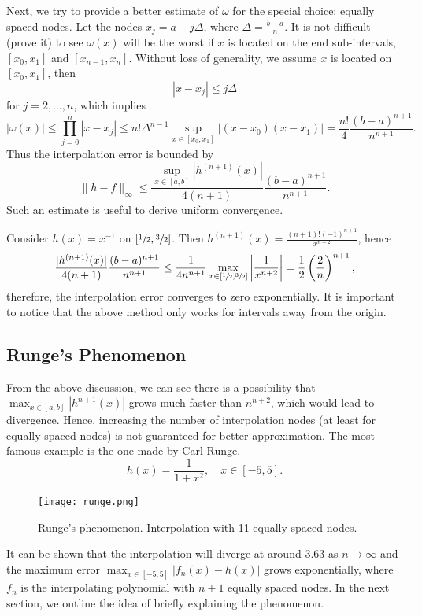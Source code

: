 Next, we try to provide a better estimate of $\omega$ for the special choice: equally spaced nodes.  Let the nodes $x_j = a + j\Delta$, where $\Delta = \frac{b-a}{n}$. It is not difficult (prove it) to see $\omega(x)$ will be the worst if $x$ is located on the end sub-intervals, $[x_0, x_1]$ and $[x_{n-1}, x_n]$. Without loss of generality, we assume $x$ is located on $[x_0, x_1]$, then 
$$|x - x_j|\le j \Delta$$
for $j = 2, \dots, n$, which implies 
\begin{equation}
\label{EQ: MAX-OMEGA}
    |\omega(x)|\le \prod_{j=0}^n |x - x_j|\le n! \Delta^{n-1} \sup_{x\in [x_0, x_1]} |(x - x_0)(x-x_1)|= \frac{n!}{4} \frac{(b-a)^{n+1}}{n^{n+1}}.
\end{equation}
Thus the interpolation error is bounded by
$$  \|h  - f\|_{\infty} \le  \frac{\sup_{x\in[a,b]}|h^{(n+1)}(x)|}{4(n+1)} \frac{(b-a)^{n+1}}{n^{n+1}}.$$
Such an estimate is useful to derive uniform convergence. 
\begin{example}
    Consider $h(x) = x^{-1}$ on $[\sfrac{1}{2}, \sfrac{3}{2}]$. Then $h^{(n+1)}(x) = \frac{(n+1)!(-1)^{n+1}}{x^{n+2}}$, hence 
    \begin{equation}
        \frac{| h^{(n+1)}(x) |}{4(n+1)}  \frac{(b-a)^{n+1}}{n^{n+1}} \le \frac{1}{4n^{n+1}}\max_{x\in[\sfrac{1}{2}, \sfrac{3}{2}]} \left| \frac{1}{x^{n+2}} \right| = \frac{1}{2} \left(\frac{2}{n}\right)^{n+1},
    \end{equation}
    therefore, the interpolation error converges to zero exponentially. It is important to notice that the above method only works for intervals away from the origin. 
\end{example} 

\subsection{Runge's Phenomenon}
\label{SSec: 2-Run-Phe}
From the above discussion, we can see there is a possibility that $\max_{x\in[a,b]}|h^{n+1}(x)|$ grows much faster than $n^{n+2}$, which would lead to divergence. Hence, increasing the number of interpolation nodes (at least for equally spaced nodes) is not guaranteed for better approximation. The most famous example is the one made by Carl Runge. 
\begin{equation}
\label{EQ: RUNGE-EXAMPLE}
    h(x) = \frac{1}{1+x^2},\quad x\in [-5, 5].
\end{equation} 
\begin{figure}[!htb]
    \centering
    \texttt{[image: runge.png]}
    \caption{Runge's phenomenon. Interpolation with 11 equally spaced nodes. }
\end{figure}
It can be shown that the interpolation will diverge at around $3.63$ as $n\to \infty$ and the maximum error $\max_{x\in[-5, 5]} |f_n(x) - h(x) |$ grows exponentially, where $f_n$ is the interpolating polynomial with $n+1$ equally spaced nodes. In the next section, we outline the idea of briefly explaining the phenomenon. 
